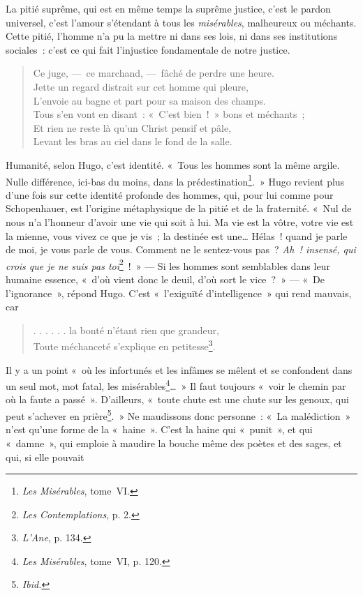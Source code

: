 \documentclass[french,twoside]{book} %
\begin{document}
\noindent La pitié suprême, qui est en même temps la suprême justice, c’est le pardon universel, c’est l’amour s’étendant à tous les \emph{misérables}, malheureux ou méchants. Cette pitié, l’homme n’a pu la mettre ni dans ses lois, ni dans ses institutions sociales : c’est ce qui fait l’injustice fondamentale de notre justice.\par


\begin{verse}
Ce juge, — ce marchand, — fâché de perdre une heure.\\
Jette un regard distrait sur cet homme qui pleure,\\
L’envoie au bagne et part pour sa maison des champs.\\
Tous s’en vont en disant : « C’est bien ! » bons et méchants ;\\
Et rien ne reste là qu’un Christ pensif et pâle,\\
Levant les bras au ciel dans le fond de la salle.\\
\end{verse}

\noindent Humanité, selon Hugo, c’est identité. « Tous les hommes sont la même argile. Nulle différence, ici-bas du moins, dans la prédestination\footnote{\emph{Les Misérables}, tome VI.}. » Hugo revient plus d’une fois sur cette identité profonde des hommes, qui, pour lui comme pour Schopenhauer, est l’origine métaphysique de la pitié et de la fraternité. « Nul de nous n’a l’honneur d’avoir une vie qui soit à lui. Ma vie est la vôtre, votre vie est la mienne, vous vivez ce que je vis ; la destinée est une… Hélas ! quand je parle de moi, je vous parle de vous. Comment ne le sentez-vous pas ? \emph{Ah ! insensé, qui crois que je ne suis pas toi}\footnote{\emph{Les Contemplations}, p. 2.} ! » — Si les hommes sont semblables dans leur humaine essence, « d’où vient donc le deuil, d’où sort le vice ? » — « De l’ignorance », répond Hugo. C’est « l’exiguïté d’intelligence » qui rend mauvais, car\par


\begin{verse}
. . . . . . la bonté n’étant rien que grandeur,\\
Toute méchanceté s’explique en petitesse\footnote{\emph{L’Ane}, p. 134.}.\\
\end{verse}

\noindent Il y a un point « où les infortunés et les infâmes se mêlent et se confondent dans un seul mot, mot fatal, les misérables\footnote{\emph{Les Misérables}, tome VI, p. 120.}… » Il faut toujours « voir le chemin par où la faute a passé ». D’ailleurs, « toute chute est une chute sur les genoux, qui peut s’achever en prière\footnote{\emph{Ibid.}}. » Ne maudissons donc personne : « La malédiction » n’est qu’une forme de la « haine ». C’est la haine qui « punit », et qui « damne », qui emploie à maudire la bouche même des poètes et des sages, et qui, si elle pouvait\par
\end{document}
